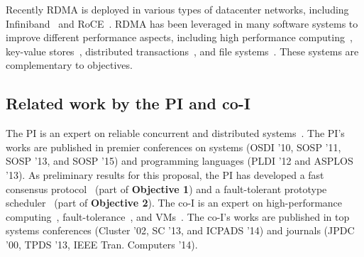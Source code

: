  Recently RDMA is deployed in various types of 
datacenter networks, including Infiniband~\cite{infiniband} and 
RoCE~\cite{roce}. RDMA has been leveraged in many 
software systems to improve different performance aspects, including high 
performance computing~\cite{openmpi}, key-value 
stores~\cite{pilaf:usenix14,herd:sigcomm14,farm:nsdi14,memcached:rdma}, 
distributed transactions~\cite{drtm:sosp15,farm:sosp15}, and file 
systems~\cite{gibson:nfs}. These systems are complementary to \xxx objectives.

\vspace{-.15in}\subsection{Related work by the PI and co-I} 
\label{sec:my-work}\vspace{-.075in}
% 

The PI is an expert on reliable concurrent and distributed 
systems~\cite{smt:cacm, cui:tern:osdi10, peregrine:sosp11,
parrot:sosp13, crane:sosp15, tripod:apsys16}. The 
PI's works are published in premier conferences on systems (OSDI '10, 
SOSP '11, SOSP '13, and SOSP '15) and programming languages (PLDI '12 and 
ASPLOS '13). As preliminary results for this \xxx proposal, the PI has 
developed a fast consensus protocol~\cite{crane:sosp15} (part of 
\textbf{Objective 1}) and a fault-tolerant prototype 
scheduler~\cite{tripod:apsys16} (part of \textbf{Objective 2}). The co-I is an 
expert on high-performance 
computing~\cite{powerrock,hwang,jessica,cheung,khokhar}, fault-tolerance~\cite{ 
sheng,shengdi1}, and VMs~\cite{rhymes,shengdi,jessica2}. The 
co-I's works are published in top systems conferences (Cluster '02, SC '13, 
and ICPADS '14) and journals (JPDC '00, TPDS '13, IEEE Tran. Computers '14).


